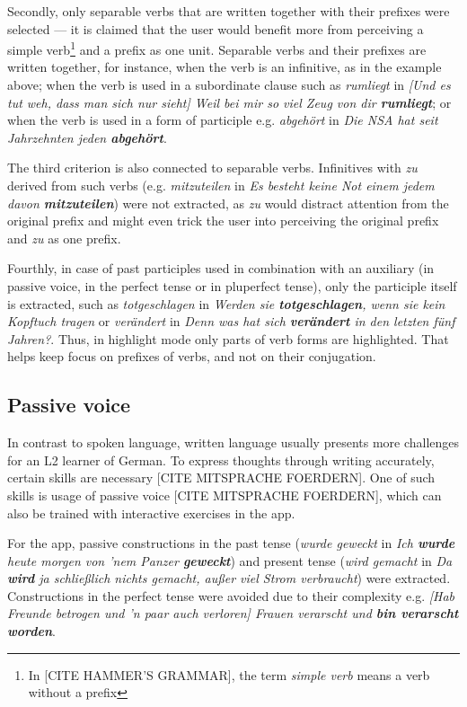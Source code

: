 Secondly, only separable verbs that are written together with their prefixes were selected --- it is claimed that the user would benefit more from perceiving a simple verb\footnote{In [CITE HAMMER'S GRAMMAR], the term \textit{simple verb} means a verb without a prefix} and a prefix as one unit. Separable verbs and their prefixes are written together, for instance, when the verb is an infinitive, as in the example above; when the verb is used in a subordinate clause such as \textit{rumliegt} in \textit{[Und es tut weh, dass man sich nur sieht] Weil bei mir so viel Zeug von dir \textbf{rumliegt}}; or when the verb is used in a form of participle e.g. \textit{abgehört} in \textit{Die NSA hat seit Jahrzehnten jeden \textbf{abgehört}}. 

The third criterion is also connected to separable verbs. Infinitives with \textit{zu} derived from such verbs (e.g. \textit{mitzuteilen} in \textit{Es besteht keine Not einem jedem davon \textbf{mitzuteilen}}) were not extracted, as \textit{zu} would distract attention from the original prefix and might even trick the user into perceiving the original prefix and \textit{zu} as one prefix.

Fourthly, in case of past participles used in combination with an auxiliary (in passive voice, in the perfect tense or in pluperfect tense), only the participle itself is extracted, such as \textit{totgeschlagen} in \textit{Werden sie \textbf{totgeschlagen}, wenn sie kein Kopftuch tragen} or \textit{verändert} in \textit{Denn was hat sich \textbf{verändert} in den letzten fünf Jahren?}. Thus, in highlight mode only parts of verb forms are highlighted. That helps keep focus on prefixes of verbs, and not on their conjugation.

\subsection{Passive voice}

In contrast to spoken language, written language usually presents more challenges for an L2 learner of German. To express thoughts through writing accurately, certain skills are necessary [CITE MITSPRACHE FOERDERN]. One of such skills is usage of passive voice [CITE MITSPRACHE FOERDERN], which can also be trained with interactive exercises in the app.

For the app, passive constructions in the past tense (\textit{wurde geweckt} in \textit{Ich \textbf{wurde} heute morgen von 'nem Panzer \textbf{geweckt}}) and present tense (\textit{wird gemacht} in \textit{Da \textbf{wird} ja schließlich nichts \textit{gemacht}, außer viel Strom verbraucht}) were extracted. Constructions in the perfect tense were avoided due to their complexity e.g. \textit{[Hab Freunde betrogen und 'n paar auch verloren] Frauen verarscht und \textbf{bin verarscht worden}}.

